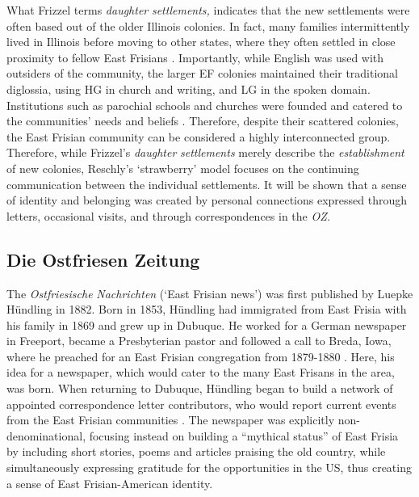 \documentclass[output=paper]{langsci/langscibook}
\begin{document}
What Frizzel terms \textit{daughter} \textit{settlements,} indicates that the new settlements were often based out of the older Illinois colonies. In fact, many families intermittently lived in Illinois before moving to other states, where they often settled in close proximity to fellow East Frisians \citep{Schnucker1917}. Importantly, while English was used with outsiders of the community, the larger EF colonies maintained their traditional diglossia, using HG in church and writing, and LG in the spoken domain. Institutions such as parochial schools and churches were founded and catered to the communities’ needs and beliefs \citep{Wirrer1995}. Therefore, despite their scattered colonies, the East Frisian community can be considered a highly interconnected group. Therefore, while Frizzel’s \textit{daughter} \textit{settlements} merely describe the \textit{establishment} of new colonies, Reschly’s ‘strawberry’ model focuses on the continuing communication between the individual settlements. It will be shown that a sense of identity and belonging was created by personal connections expressed through letters, occasional visits, and through correspondences in the \textit{OZ.} 

\subsection{Die Ostfriesen Zeitung} %
\label{sec:rocker:3.2}

The \textit{Ostfriesische} \textit{Nachrichten} (‘East Frisian news’) was first published by Luepke Hündling in 1882. Born in 1853, Hündling had immigrated from East Frisia with his family in 1869 and grew up in Dubuque. He worked for a German newspaper in Freeport, became a Presbyterian pastor and followed a call to Breda, Iowa, where he preached for an East Frisian congregation from 1879-1880 \citep{Lindaman2004}. Here, his idea for a newspaper, which would cater to the many East Frisans in the area, was born. When returning to Dubuque, Hündling began to build a network of appointed correspondence letter contributors, who would report current events from the East Frisian communities \citep[81]{Lindaman2004}. The newspaper was explicitly non-denominational, focusing instead on building a “mythical status” \citep[82]{Lindaman2004} of East Frisia by including short stories, poems and articles praising the old country, while simultaneously expressing gratitude for the opportunities in the US, thus creating a sense of East Frisian-American identity. 
\end{document}
